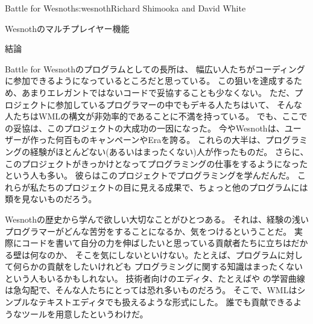 \begin{aosachapter}{Battle for Wesnoth}{s:wesnoth}{Richard Shimooka and David White}
\begin{aosasect1}{Wesnothのマルチプレイヤー機能}
\end{aosasect1}

\begin{aosasect1}{結論}

Battle for Wesnothのプログラムとしての長所は、
幅広い人たちがコーディングに参加できるようになっているところだと思っている。
この狙いを達成するため、あまりエレガントではないコードで妥協することも少なくない。
ただ、プロジェクトに参加しているプログラマーの中でもデキる人たちはいて、
そんな人たちはWMLの構文が非効率的であることに不満を持っている。
でも、ここでの妥協は、このプロジェクトの大成功の一因になった。
今やWesnothは、ユーザーが作った何百ものキャンペーンやEraを誇る。
これらの大半は、プログラミングの経験がほとんどない(あるいはまったくない)人が作ったものだ。
さらに、このプロジェクトがきっかけとなってプログラミングの仕事をするようになったという人も多い。
彼らはこのプロジェクトでプログラミングを学んだんだ。
これらが私たちのプロジェクトの目に見える成果で、ちょっと他のプログラムには類を見ないものだろう。

Wesnothの歴史から学んで欲しい大切なことがひとつある。
それは、経験の浅いプログラマーがどんな苦労をすることになるか、気をつけるということだ。
実際にコードを書いて自分の力を伸ばしたいと思っている貢献者たちに立ちはだかる壁は何なのか、
そこを気にしないといけない。たとえば、プログラムに対して何らかの貢献をしたいけれども
プログラミングに関する知識はまったくないという人もいるかもしれない。
技術者向けのエディタ、たとえばや
の学習曲線は急勾配で、そんな人たちにとっては恐れ多いものだろう。
そこで、WMLはシンプルなテキストエディタでも扱えるような形式にした。
誰でも貢献できるようなツールを用意したというわけだ。


\end{aosasect1}
\end{aosachapter}
